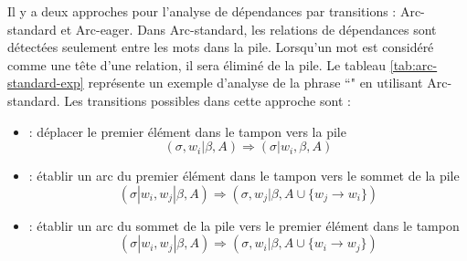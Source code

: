 \documentclass{KodeBook}
\begin{document}
Il y a deux approches pour l'analyse de dépendances par transitions : Arc-standard et Arc-eager. 
Dans Arc-standard, les relations de dépendances sont détectées seulement entre les mots dans la pile. 
Lorsqu'un mot est considéré comme une tête d'une relation, il sera éliminé de la pile. 
Le tableau \ref{tab:arc-standard-exp} représente un exemple d'analyse de la phrase ``" en utilisant Arc-standard.
Les transitions possibles dans cette approche sont :
\begin{itemize}
	\item {} : déplacer le premier élément dans le tampon vers la pile 
	\[ (\sigma, w_i|\beta, A) \Rightarrow  (\sigma|w_i, \beta, A) \]
	
	\item {} : établir un arc du premier élément dans le tampon vers le sommet de la pile
	\[ (\sigma|w_i, w_j|\beta, A) \Rightarrow  (\sigma, w_j|\beta, A \cup \{w_j \rightarrow w_i \}) \] 
	
	\item {} : établir un arc du sommet de la pile vers le premier élément dans le tampon
	\[ (\sigma|w_i, w_j|\beta, A) \Rightarrow  (\sigma, w_i|\beta, A \cup \{w_i \rightarrow w_j \}) \] 
\end{itemize}
\end{document}
